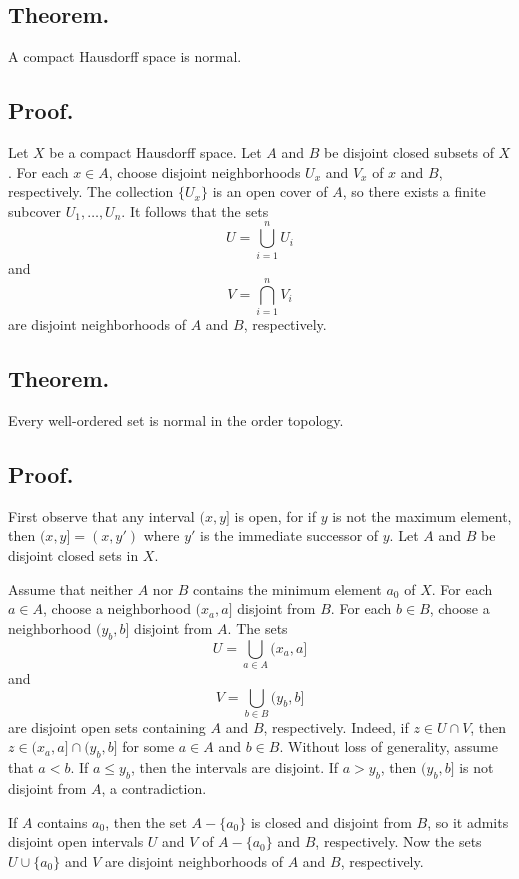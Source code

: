 \documentclass[titlepage]{article}
\begin{document}
\subsection{Theorem.} A compact Hausdorff space is normal.

\subsection{Proof.} Let $X$ be a compact Hausdorff space. Let $A$ and $B$ be disjoint closed subsets of $X$. For each $x \in A$, choose disjoint neighborhoods $U_{x}$ and $V_{x}$ of $x$ and $B$, respectively. The collection $\{U_{x}\}$ is an open cover of $A$, so there exists a finite subcover $U_{1}, \ldots, U_{n}$. It follows that the sets 
$$U = \bigcup_{i=1}^{n} U_{i}$$
and 
$$V = \bigcap_{i=1}^{n} V_{i}$$
are disjoint neighborhoods of $A$ and $B$, respectively.

\subsection{Theorem.} Every well-ordered set is normal in the order topology.

\subsection{Proof.} First observe that any interval $(x, y]$ is open, for if $y$ is not the maximum element, then $(x, y] = (x, y')$ where $y'$ is the immediate successor of $y$. Let $A$ and $B$ be disjoint closed sets in $X$.

Assume that neither $A$ nor $B$ contains the minimum element $a_{0}$ of $X$. For each $a \in A$, choose a neighborhood $(x_{a}, a]$ disjoint from $B$. For each $b \in B$, choose a neighborhood $(y_{b}, b]$ disjoint from $A$. The sets
$$U = \bigcup_{a \in A} (x_{a}, a]$$
and 
$$V = \bigcup_{b \in B} (y_{b}, b]$$
are disjoint open sets containing $A$ and $B$, respectively. Indeed, if $z \in U \cap V$, then $z \in (x_{a}, a] \cap (y_{b}, b]$ for some $a \in A$ and $b \in B$. Without loss of generality, assume that $a < b$. If $a \leq y_{b}$, then the intervals are disjoint. If $a > y_{b}$, then $(y_{b}, b]$ is not disjoint from $A$, a contradiction.

If $A$ contains $a_{0}$, then the set $A - \{a_{0}\}$ is closed and disjoint from $B$, so it admits disjoint open intervals $U$ and $V$ of $A - \{a_{0}\}$ and $B$, respectively. Now the sets $U \cup \{a_{0}\}$ and $V$ are disjoint neighborhoods of $A$ and $B$, respectively.
\end{document}
